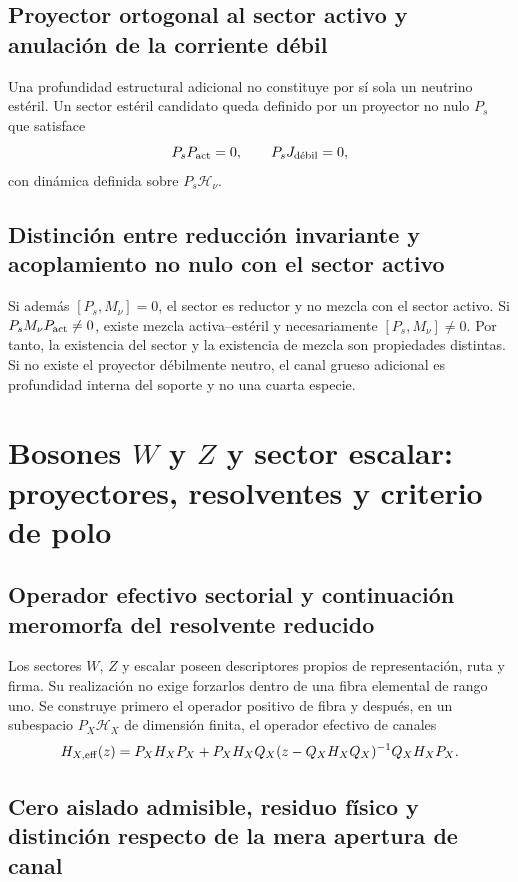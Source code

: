 \subsection{Proyector ortogonal al sector activo y anulación de la corriente débil}

Una profundidad estructural adicional no constituye por sí sola un neutrino
estéril. Un sector estéril candidato queda definido por un proyector no nulo
\(P_s\) que satisface
\[
 P_s P_{\rm act}=0,
 \qquad P_s J_{\text{débil}}=0,
\]
con dinámica definida sobre \(P_s\mathcal H_\nu\).

\subsection{Distinción entre reducción invariante y acoplamiento no nulo con el sector activo}

Si además \([P_s,M_\nu]=0\), el sector es reductor y no mezcla con el sector activo. Si
\(P_sM_\nu P_{\rm act}\ne0\), existe mezcla activa--estéril y necesariamente
\([P_s,M_\nu]\ne0\). Por tanto, la existencia del sector y la existencia de
mezcla son propiedades distintas. Si no existe el proyector débilmente neutro,
el canal grueso adicional es profundidad interna del soporte y no una cuarta
especie.

\section{Bosones \texorpdfstring{\(W\) y \(Z\)}{W y Z} y sector escalar: proyectores, resolventes y criterio de polo}

\subsection{Operador efectivo sectorial y continuación meromorfa del resolvente reducido}

Los sectores \(W\), \(Z\) y escalar poseen descriptores propios de
representación, ruta y firma. Su realización no exige forzarlos dentro de una
fibra elemental de rango uno. Se construye primero el operador positivo de
fibra y después, en un subespacio \(P_X\mathcal H_X\) de dimensión finita, el
operador efectivo de canales
\[
 H_{X,\rm eff}(z)
 =P_X H_X P_X
 +P_X H_X Q_X(z-Q_X H_X Q_X)^{-1}Q_X H_X P_X.
\]
\subsection{Cero aislado admisible, residuo físico y distinción respecto de la mera apertura de canal}

